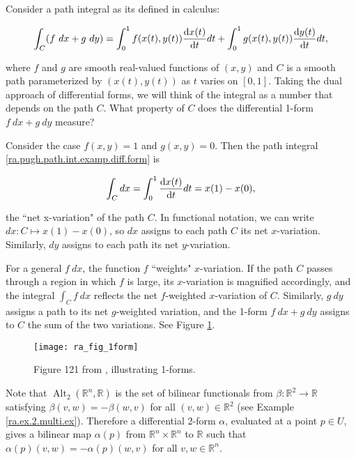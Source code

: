 \begin{example}\label{ra.ex.1.form.int.pugh}

Consider a path integral as its defined in calculus:

\begin{equation}\label{ra.pugh.path.int.examp.diff.form}
\int_C (f \ dx + g\ dy) = \int_0^1 f(x(t), y(t)) \deriv{x(t)}{t} dt + \int_0^1  g(x(t), y(t)) \deriv{y(t)}{t} dt,
\end{equation}

where \(f\) and \(g\) are smooth real-valued functions of \((x,y)\) and \(C\) is a smooth path parameterized by \((x(t), y(t))\) as \(t\) varies on \([0,1]\). Taking the dual approach of differential forms, we will think of the integral as a number that depends on the path \(C\). What property of \(C\) does the differential 1-form \(f \ dx + g\ dy\) measure?

Consider the case \(f(x,y)= 1\) and \(g(x,y)= 0\). Then the path integral \eqref{ra.pugh.path.int.examp.diff.form} is

\[
\int_C dx = \int_0^1 \deriv{x(t)}{t} dt = x(1) - x(0),
\]

the ``net x-variation" of the path \(C\). In functional notation, we can write \(dx: C \mapsto x(1) - x(0)\), so \(dx\) assigns to  each path \(C\) its net \(x\)-variation. Similarly, \(dy\) assigns  to each path its net \(y\)-variation.

For a general  \(f \ dx\), the function \(f\) ``weights" \(x\)-variation. If the path \(C\) passes through a region in which \(f\) is large, its \(x\)-variation is magnified accordingly, and the integral \(\int_C f \ dx\) reflects the net \(f\)-weighted \(x\)-variation of \(C\). Similarly, \(g \ dy\) assigns a path to its net  \(g\)-weighted variation, and the 1-form \(f \  dx + g\ dy\) assigns to \(C\) the sum of the two variations. See Figure \ref{ra_fig_1form_fig}.

\begin{figure}[htbp]
\begin{center}
\texttt{[image: ra\_fig\_1form]}
\caption{Figure 121 from \citet{pugh2015real}, illustrating 1-forms.}
\label{ra_fig_1form_fig}
\end{center}
\end{figure}


\end{example}

\begin{example}\label{ra.ex.2.multi.form.ex}

Note that \(\operatorname{Alt}_2(\mathbb{R}^n, \mathbb{R})\) is the set of bilinear functionals from \(\beta: \mathbb{R}^2 \to \mathbb{R}\) satisfying \(\beta(v, w) = - \beta(w, v)\) for all \((v,w) \in \mathbb{R}^2\) (see Example \ref{ra.ex.2.multi.ex}). Therefore a differential 2-form \(\alpha\), evaluated at a point \(p \in U\), gives a bilinear map \(\alpha(p)\) from \(\mathbb{R}^n \times \mathbb{R}^n\) to \(\mathbb{R}\) such that \(\alpha(p)(v, w) = - \alpha(p)(w,v)\) for all \(v, w \in \mathbb{R}^n\).

\end{example}

